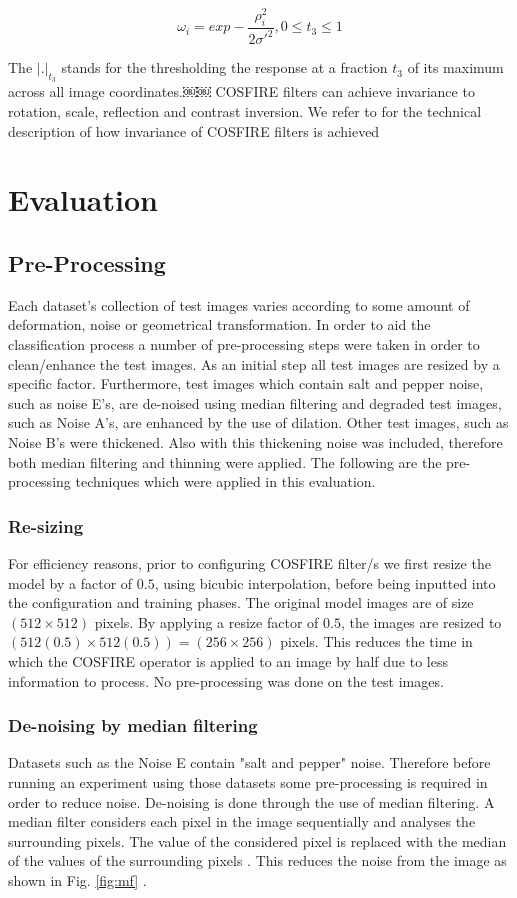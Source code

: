 \begin{equation}
\omega_{i} = exp -\frac{\rho_{i}^2}{2\sigma'^2} , 0 \leq t_{3} \leq 1
\end{equation}

The $|.|_{t_{3}}$ stands for the thresholding the response at a fraction $t_{3}$ of its maximum across all image coordinates.￼￼ COSFIRE filters can achieve invariance to rotation, scale, reflection and contrast inversion. We refer to \cite{Azzopardi_Petkov_2012} for the technical description of how invariance of COSFIRE filters is achieved


\section {Evaluation}
\label{sec:evaluation}
\subsection{Pre-Processing}
Each dataset's collection of test images varies according to some amount of deformation, noise or geometrical transformation. In order to aid the classification process a number of pre-processing steps were taken in order to clean/enhance the test images. As an initial step all test images are resized by a specific factor. 
Furthermore, test images which contain salt and pepper noise, such as noise E's, are de-noised using median filtering and degraded test images, such as Noise A's, are enhanced by the use of dilation. Other test images, such as Noise B's were thickened. Also with this thickening noise was included, therefore both median filtering and thinning were applied. The following are the pre-processing techniques which were applied in this evaluation.

\subsubsection{Re-sizing}
For efficiency reasons, prior to configuring COSFIRE filter/s we first resize the model by a factor of $0.5$, using bicubic interpolation, before being inputted into the configuration and training phases. The original model images are of size $(512 \times 512)$ pixels. By applying a resize factor of $0.5$, the images are resized to $(512(0.5) \times 512(0.5)) = (256 \times 256)$ pixels. This reduces the time in which the COSFIRE operator is applied to an image by half due to less information to process. No pre-processing was done on the test images.

\subsubsection{De-noising by median filtering}
Datasets such as the Noise E contain "salt and pepper" noise. Therefore before running an experiment using those datasets some pre-processing is required in order to reduce noise. De-noising is done through the use of median filtering. A median filter considers each pixel in the image sequentially and analyses the surrounding pixels. The value of the considered pixel is replaced with the median of the values of the surrounding pixels \cite{medianFiltering}. This reduces the noise from the image as shown in Fig. \ref{fig:mf} .

